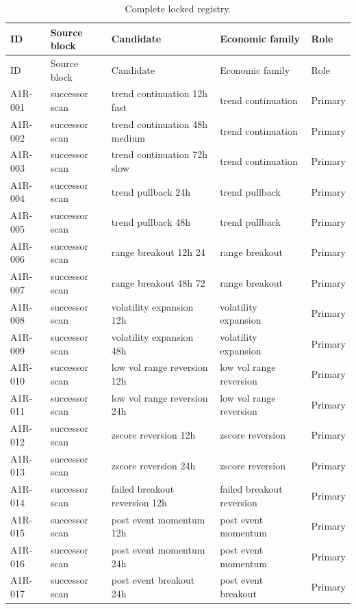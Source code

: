 \begingroup\footnotesize\setlength{\tabcolsep}{3pt}
\begin{longtable}{P{1.1cm}P{1.9cm}P{3.7cm}P{3.1cm}P{1.5cm}}
\caption{Complete locked registry.}\label{tab:s_registry}\\
\toprule ID & Source block & Candidate & Economic family & Role \\
\midrule\endfirsthead
\toprule ID & Source block & Candidate & Economic family & Role \\
\midrule\endhead
A1R-001 & successor scan & trend continuation 12h fast & trend continuation & Primary \\
A1R-002 & successor scan & trend continuation 48h medium & trend continuation & Primary \\
A1R-003 & successor scan & trend continuation 72h slow & trend continuation & Primary \\
A1R-004 & successor scan & trend pullback 24h & trend pullback & Primary \\
A1R-005 & successor scan & trend pullback 48h & trend pullback & Primary \\
A1R-006 & successor scan & range breakout 12h 24 & range breakout & Primary \\
A1R-007 & successor scan & range breakout 48h 72 & range breakout & Primary \\
A1R-008 & successor scan & volatility expansion 12h & volatility expansion & Primary \\
A1R-009 & successor scan & volatility expansion 48h & volatility expansion & Primary \\
A1R-010 & successor scan & low vol range reversion 12h & low vol range reversion & Primary \\
A1R-011 & successor scan & low vol range reversion 24h & low vol range reversion & Primary \\
A1R-012 & successor scan & zscore reversion 12h & zscore reversion & Primary \\
A1R-013 & successor scan & zscore reversion 24h & zscore reversion & Primary \\
A1R-014 & successor scan & failed breakout reversion 12h & failed breakout reversion & Primary \\
A1R-015 & successor scan & post event momentum 12h & post event momentum & Primary \\
A1R-016 & successor scan & post event momentum 24h & post event momentum & Primary \\
A1R-017 & successor scan & post event breakout 24h & post event breakout & Primary \\

\end{longtable}
